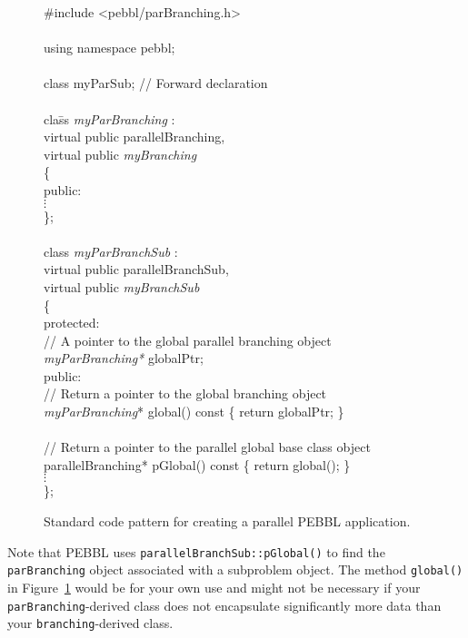 \begin{figure}[tbp]
\begin{codeblock}
\#include <pebbl/parBranching.h> \\
\\
using namespace pebbl; \\
\\
class myParSub;  // Forward declaration \\
\\
cla\=ss \emph{myParBranching} : \\
\>virtual public parallelBranching, \\
\>virtual public \emph{myBranching} \\
\{\\
public: \\
\>$\vdots$\\
\}; \\
\\
class \emph{myParBranchSub} : \\
\> virtual public parallelBranchSub, \\
\> virtual public \emph{myBranchSub} \\
\{\\
protected:\\
\>  // A pointer to the global parallel branching object\\
\>  \emph{myParBranching*} globalPtr;\\
public:\\
\>  // Return a pointer to the global branching object\\
\>  \emph{myParBranching}* global() const \{ return globalPtr; \}\\
\\
\>  // Return a pointer to the parallel global base class object\\
\>  parallelBranching* pGlobal() const \{ return global(); \}\\
\>$\vdots$\\
\};
\end{codeblock}
\vspace{-2ex}
\caption{Standard code pattern for creating a parallel PEBBL application.}
\label{fig:code2}
\end{figure}
Note that PEBBL uses \texttt{parallelBranchSub::pGlobal()} 
to find the
\texttt{parBranching} object associated with a subproblem object. The
method \texttt{global()} in Figure~\ref{fig:code2} would be for your
own use and might not be necessary if your
\texttt{parBranching}-derived class does not encapsulate significantly
more data than your \texttt{branching}-derived class.


